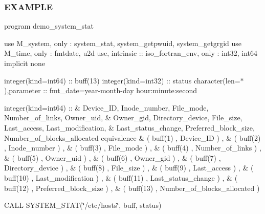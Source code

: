 \subsubsection*{E\+X\+A\+M\+P\+LE}

program demo\+\_\+system\+\_\+stat

use M\+\_\+system, only \+: system\+\_\+stat, system\+\_\+getpwuid, system\+\_\+getgrgid use M\+\_\+time, only \+: fmtdate, u2d use, intrinsic \+:\+: iso\+\_\+fortran\+\_\+env, only \+: int32, int64 implicit none

integer(kind=int64) \+:\+: buff(13) integer(kind=int32) \+:\+: status character(len=$\ast$),parameter \+:\+: fmt\+\_\+date=\textquotesingle{}year-\/month-\/day hour\+:minute\+:second\textquotesingle{}

integer(kind=int64) \+:\+: \& Device\+\_\+\+ID, Inode\+\_\+number, File\+\_\+mode, Number\+\_\+of\+\_\+links, Owner\+\_\+uid, \& Owner\+\_\+gid, Directory\+\_\+device, File\+\_\+size, Last\+\_\+access, Last\+\_\+modification, \& Last\+\_\+status\+\_\+change, Preferred\+\_\+block\+\_\+size, Number\+\_\+of\+\_\+blocks\+\_\+allocated equivalence \& ( buff(1) , Device\+\_\+\+ID ) , \& ( buff(2) , Inode\+\_\+number ) , \& ( buff(3) , File\+\_\+mode ) , \& ( buff(4) , Number\+\_\+of\+\_\+links ) , \& ( buff(5) , Owner\+\_\+uid ) , \& ( buff(6) , Owner\+\_\+gid ) , \& ( buff(7) , Directory\+\_\+device ) , \& ( buff(8) , File\+\_\+size ) , \& ( buff(9) , Last\+\_\+access ) , \& ( buff(10) , Last\+\_\+modification ) , \& ( buff(11) , Last\+\_\+status\+\_\+change ) , \& ( buff(12) , Preferred\+\_\+block\+\_\+size ) , \& ( buff(13) , Number\+\_\+of\+\_\+blocks\+\_\+allocated )

C\+A\+LL S\+Y\+S\+T\+E\+M\+\_\+\+S\+T\+AT(\char`\"{}/etc/hosts\char`\"{}, buff, status)

